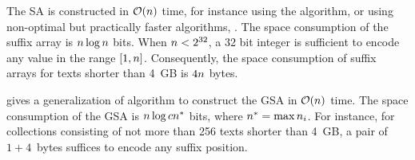 The SA is constructed in $\mathcal{O}(n)$ time, for instance using the \citep{Kaerkkaeinen2003} algorithm, or using non-optimal but practically faster algorithms, \eg \citep{Schuermann2007}.
The space consumption of the suffix array is $n \log{n}$ bits.
When $n < 2^{32}$, a 32 bit integer is sufficient to encode any value in the range $[1,n]$.
Consequently, the space consumption of suffix arrays for texts shorter than 4~GB is $4 n$ bytes.

\cite{Weese2013} gives a generalization of \citeauthor{Kaerkkaeinen2003} algorithm to construct the GSA in $\mathcal{O}(n)$ time.
The space consumption of the GSA is $n \log{cn^*}$ bits, where $n^* = \text{max}{\,n_i}$.
For instance, for collections consisting of not more than 256 texts shorter than 4~GB, a pair of $1+4$~bytes suffices to encode any suffix position.



